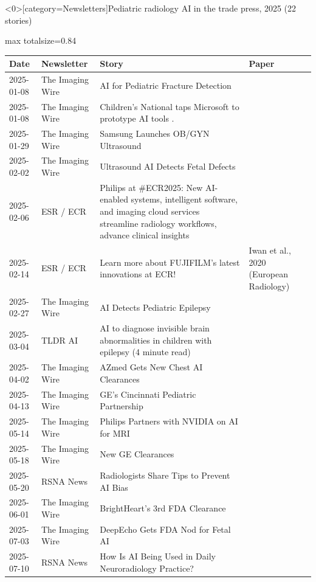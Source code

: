 \documentclass[aspectratio=169]{beamer}
\renewcommand{\arraystretch}{1.08}
\begin{document}
\begin{frame}<0>[category=Newsletters]{Pediatric radiology AI in the trade press, 2025 (22 stories)}
\tiny
\begin{adjustbox}{max totalsize={\textwidth}{0.84\textheight}}
\renewcommand{\arraystretch}{1.2}
\begin{tabular}{|l|l|>{\raggedright\arraybackslash}p{}|>{\raggedright\arraybackslash}p{}|}
\hline \textbf{Date} & \textbf{Newsletter} & \textbf{Story} & \textbf{Paper} \\ \hline
2025-01-08 & The Imaging Wire & AI for Pediatric Fracture Detection &  \\ \hline
2025-01-08 & The Imaging Wire & Children's National taps Microsoft to prototype AI tools . &  \\ \hline
2025-01-29 & The Imaging Wire & Samsung Launches OB/GYN Ultrasound &  \\ \hline
2025-02-02 & The Imaging Wire & Ultrasound AI Detects Fetal Defects &  \\ \hline
2025-02-06 & ESR / ECR & Philips at \#ECR2025: New AI-enabled systems, intelligent software, and imaging cloud services streamline radiology workflows, advance clinical insights &  \\ \hline
2025-02-14 & ESR / ECR & Learn more about FUJIFILM's latest innovations at ECR! & Iwan et al., 2020 (European Radiology) \\ \hline
2025-02-27 & The Imaging Wire & AI Detects Pediatric Epilepsy &  \\ \hline
2025-03-04 & TLDR AI & AI to diagnose invisible brain abnormalities in children with epilepsy (4 minute read) &  \\ \hline
2025-04-02 & The Imaging Wire & AZmed Gets New Chest AI Clearances &  \\ \hline
2025-04-13 & The Imaging Wire & GE's Cincinnati Pediatric Partnership &  \\ \hline
2025-05-14 & The Imaging Wire & Philips Partners with NVIDIA on AI for MRI &  \\ \hline
2025-05-18 & The Imaging Wire & New GE Clearances &  \\ \hline
2025-05-20 & RSNA News & Radiologists Share Tips to Prevent AI Bias &  \\ \hline
2025-06-01 & The Imaging Wire & BrightHeart's 3rd FDA Clearance &  \\ \hline
2025-07-03 & The Imaging Wire & DeepEcho Gets FDA Nod for Fetal AI &  \\ \hline
2025-07-10 & RSNA News & How Is AI Being Used in Daily Neuroradiology Practice? &  \\ \hline

\end{tabular}
\end{adjustbox}
\end{frame}
\end{document}
